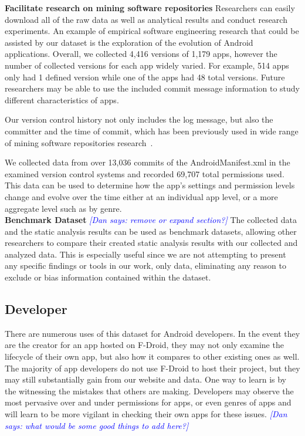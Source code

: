 \documentclass[journal,transmag]{IEEEtran}
\newcommand{\dan}[1]{\textcolor{blue}{{\it [Dan says: #1]}}}
\begin{document}
\textbf{Facilitate research on mining software repositories}
Researchers can easily download all of the raw data as well as analytical results and conduct research experiments. An example of empirical software engineering research that could be assisted by our dataset is the exploration of the evolution of Android applications. Overall, we collected 4,416 versions of 1,179 apps, however the number of collected versions for each app widely varied. For example, 514 apps only had 1 defined version while one of the apps had 48 total versions. Future researchers may be able to use the included commit message information to study different characteristics of apps.

Our version control history not only includes the log message, but also the committer and the time of commit, which has been previously used in wide range of mining software repositories research~\cite{Eyolfson:2011:TDD:1985441.1985464, bachmann2010missing, Buse:2010:ADP:1858996.1859005, Dallmeier:2007:EBL:1321631.1321702}.


We collected data from over 13,036 commits of the AndroidManifest.xml in the examined version control systems and recorded 69,707 total permissions used. This data can be used to determine how the app's settings and permission levels change and evolve over the time either at an individual app level, or a more aggregate level such as by genre.\\


%



\textbf{Benchmark Dataset}
\dan{remove or expand section?}
The collected data and the static analysis results can be used as benchmark datasets, allowing other researchers to compare their created static analysis results with our collected and analyzed data. This is especially useful since we are not attempting to present any specific findings or tools in our work, only data, eliminating any reason to exclude or bias information contained within the dataset.


\subsection{Developer}

There are numerous uses of this dataset for Android developers. In the event they are the creator for an app hosted on F-Droid, they may not only examine the lifecycle of their own app, but also how it compares to other existing ones as well. The majority of app developers do not use F-Droid to host their project, but they may still substantially gain from our website and data. One way to learn is by the witnessing the mistakes that others are making. Developers may observe the most pervasive over and under permissions for apps, or even genres of apps and will learn to be more vigilant in checking their own apps for these issues. \dan{what would be some good things to add here?}
\end{document}
